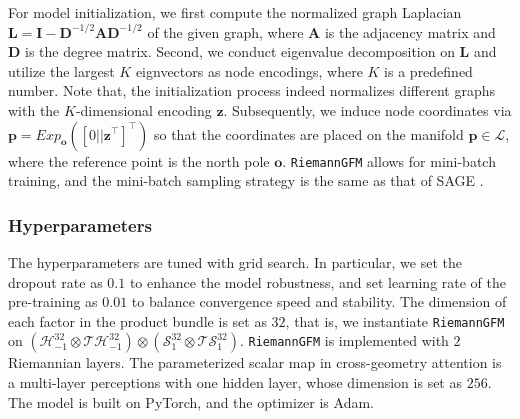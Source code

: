 For model initialization, we first compute the normalized graph Laplacian $\boldsymbol{L}=\boldsymbol{I} - \boldsymbol{D}^{-1/2}\boldsymbol{A}\boldsymbol{D}^{-1/2}$ of the given graph, where $\boldsymbol{A}$ is the adjacency matrix and $\boldsymbol{D}$ is the degree matrix.
Second, we conduct eigenvalue decomposition on $\boldsymbol{L}$  and utilize the largest $K$ eignvectors as node encodings, where $K$ is a predefined number.
Note that, the initialization process indeed normalizes different graphs with the $K$-dimensional encoding $\boldsymbol z$.
Subsequently, we induce  node coordinates via $\boldsymbol p= Exp_{\boldsymbol o}([0 || \boldsymbol z^\top]^\top)$ so that the coordinates are placed on the manifold $\boldsymbol p \in \mathcal L$, where the reference point is the north pole $\boldsymbol o$.
\texttt{RiemannGFM} allows for mini-batch training, and the mini-batch sampling strategy  is the same as that of  SAGE \cite{nips17GraphSAGE}.

\vspace{-0.05in}
\subsubsection{\textbf{Hyperparameters}}

The hyperparameters are  tuned with grid search. 
In particular, we set the dropout rate as $0.1$ to enhance the model robustness, and set learning rate of the pre-training as $0.01$ to balance convergence speed and stability. 
The  dimension of each factor in the product bundle is set as $32$, that is,  we instantiate \texttt{RiemannGFM} on  $\left(\mathcal H^{32}_{-1} \otimes \mathcal T\mathcal H^{32}_{-1}\right) \otimes \left(\mathcal S^{32}_{1} \otimes \mathcal T\mathcal S^{32}_{1}\right)$.
\texttt{RiemannGFM} is implemented with $2$ Riemannian layers.
The parameterized scalar map in cross-geometry attention is a multi-layer perceptions with one hidden layer, whose dimension is set as $256$.
The model is built on PyTorch, and the optimizer is Adam.






